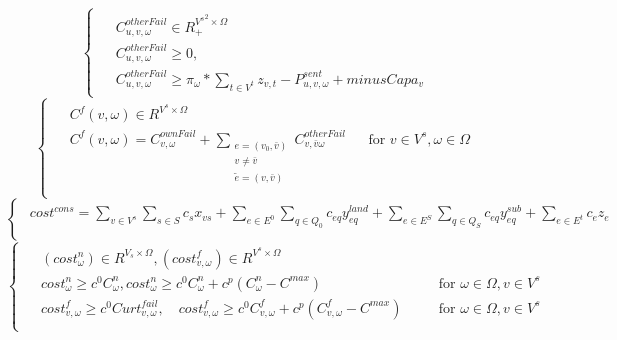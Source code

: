 \documentclass[a4paper,12pt]{article}
\begin{document}
    \begin{equation}
        \begin{cases}
            \begin{alignedat}{2}
                & C_{u, v, \omega}^{otherFail} \in R^{{V^s}^2 \times \Omega}_+ \\
                & C_{u, v, \omega}^{otherFail} \geq 0, \\
                & C_{u, v, \omega}^{otherFail} \geq \pi_\omega * \sum_{t \in V^t} z_{v,t} - P_{u, v, \omega}^{sent} + minusCapa_v
            \end{alignedat}
        \end{cases}
    \end{equation}
    \begin{equation}
        \begin{cases}
            \begin{alignedat}{2}
                & C^f(v, \omega) \in R^{V^s \times \Omega} && \\
                & C^f(v, \omega) = C_{v, \omega}^{ownFail} + \sum_{\substack{e = (v_0, \bar{v}) \\ v \neq \bar{v} \\ \tilde{e} = (v, \bar{v})}} C_{v, \bar{v} \omega}^{otherFail} && \text{for } v \in V^s, \omega \in \Omega \\
            \end{alignedat}
        \end{cases}
    \end{equation}
    \begin{equation}
        \begin{cases}
            \begin{alignedat} {2}
                cost^{cons} = \sum_{v \in V^s} \sum _{s \in S} c_s x_{vs} + \sum_{e \in E^0} \sum_{q \in Q_0} c_{eq} y_{eq}^{land} + \sum _{e \in E^S} \sum_{q \in Q_S} c_{eq} y_{eq}^{sub} + \sum_{e \in E^t} c_e z_e \\
            \end{alignedat}
        \end{cases}
    \end{equation}
    \begin{equation}
        \begin{cases}
            \begin{alignedat}{3}
                & (cost_{\omega}^{n}) \in R^{V_{s} \times \Omega} , (cost_{v,\omega}^{f}) \in R^{V^{s} \times \Omega} \\
                & cost_{\omega}^{n} \geq c^{0}C_{\omega}^{n} , cost_{\omega}^{n} \geq c^{0}C_{\omega}^{n} + c^{p}(C_{\omega}^{n}-C^{max}) \quad &&  \text{for } \omega \in\Omega, v \in V^{s} \\
                & cost_{v,\omega}^{f} \geq c^{0}Curt_{v,\omega}^{fail}, \quad cost_{v,\omega}^{f} \geq c^{0}C_{v,\omega}^{f} + c^{p}(C_{v,\omega}^{f} - C^{max}) \quad && \text{for } \omega \in\Omega, v \in V^{s} \\
            \end{alignedat}
        \end{cases}
    \end{equation}
\end{document}
